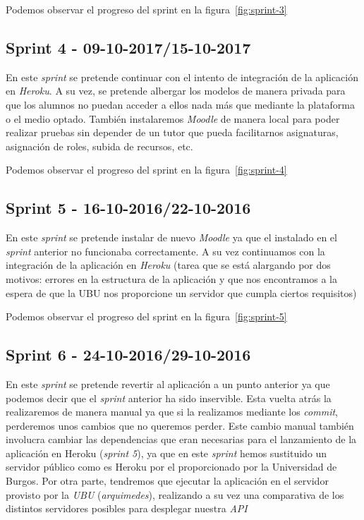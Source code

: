 Podemos observar el progreso del sprint en la figura~\ref{fig:sprint-3}

\subsection{Sprint 4 - 09-10-2017/15-10-2017}
En este \textit{sprint} se pretende continuar con el intento de integración de la aplicación en \textit{Heroku}. A su vez, se pretende albergar los modelos de manera privada para que los alumnos no puedan acceder a ellos nada más que mediante la plataforma o el medio optado. También instalaremos \textit{Moodle} de manera local para poder realizar pruebas sin depender de un tutor que pueda facilitarnos asignaturas, asignación de roles, subida de recursos, etc.

Podemos observar el progreso del sprint en la figura~\ref{fig:sprint-4}

\subsection{Sprint 5 - 16-10-2016/22-10-2016}
En este \textit{sprint} se pretende instalar de nuevo \textit{Moodle} ya que el instalado en el \textit{sprint} anterior no funcionaba correctamente. A su vez continuamos con la integración de la aplicación en \textit{Heroku} (tarea que se está alargando por dos motivos: errores en la estructura de la aplicación y que nos encontramos a la espera de que la UBU nos proporcione un servidor que cumpla ciertos requisitos)

Podemos observar el progreso del sprint en la figura~\ref{fig:sprint-5}

\subsection{Sprint 6 - 24-10-2016/29-10-2016}
En este \textit{sprint} se pretende revertir al aplicación a un punto anterior ya que podemos decir que el \textit{sprint} anterior ha sido inservible. Esta vuelta atrás la realizaremos de manera manual ya que si la realizamos mediante los \textit{commit}, perderemos unos cambios que no queremos perder. Este cambio manual también involucra cambiar las dependencias que eran necesarias para el lanzamiento de la aplicación en Heroku (\textit{sprint 5}), ya que en este \textit{sprint} hemos sustituido un servidor público como es Heroku por el proporcionado por la Universidad de Burgos. Por otra parte, tendremos que ejecutar la aplicación en el servidor provisto por la \textit{UBU} (\textit{arquimedes}), realizando a su vez una comparativa de los distintos servidores posibles para desplegar nuestra \textit{API}

